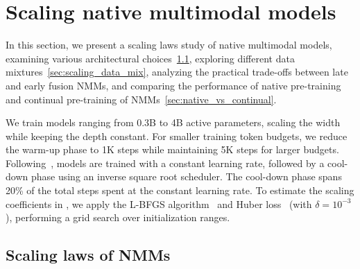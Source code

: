 





 











\section{Scaling  native multimodal models}








In this section, we present a scaling laws study of native multimodal models,
examining various architectural choices~\cref{sec:scaling_laws_early}, exploring
different data mixtures~\cref{sec:scaling_data_mix}, analyzing the practical
trade-offs between late and early fusion
NMMs, and comparing the performance of native
pre-training and continual pre-training of NMMs~\cref{sec:native_vs_continual}.  

 We train models ranging from 0.3B to 4B active parameters,
scaling the width while keeping the depth constant. For smaller training token
budgets, we reduce the warm-up phase to 1K steps while maintaining 5K steps for
larger budgets.  
Following~\citet{hagele2024scaling}, models are trained with a constant learning
rate, followed by a cool-down phase using an inverse square root scheduler. The
cool-down phase spans 20\% of the total steps spent at the constant learning
rate.  To estimate the scaling coefficients in , we apply the
L-BFGS algorithm~\citep{lbfgs} and Huber loss~\citep{Huber1992} (with $\delta =
10^{-3}$), performing a grid search over initialization ranges.  







       






\vspace{-0.5cm}
\subsection{Scaling laws of NMMs}
\label{sec:scaling_laws_early}

